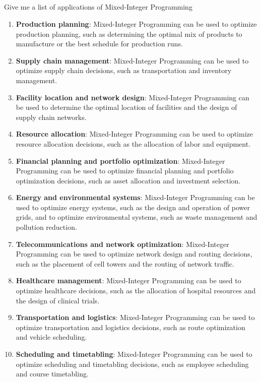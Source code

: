 \newpage

\subsection*{}

\begin{bclogo}[logo=\bcvaletcoeur]{\small \vspace{.2cm} Give me a list of applications of Mixed-Integer Programming}
\vspace{.2cm}

\footnotesize

\begin{enumerate}
\item \textbf{Production planning}: Mixed-Integer Programming can be used to optimize production planning, such as determining the optimal mix of products to manufacture or the best schedule for production runs.
\item \textbf{Supply chain management}: Mixed-Integer Programming can be used to optimize supply chain decisions, such as transportation and inventory management.
\item \textbf{Facility location and network design}: Mixed-Integer Programming can be used to determine the optimal location of facilities and the design of supply chain networks.
\item \textbf{Resource allocation}: Mixed-Integer Programming can be used to optimize resource allocation decisions, such as the allocation of labor and equipment.
\item \textbf{Financial planning and portfolio optimization}: Mixed-Integer Programming can be used to optimize financial planning and portfolio optimization decisions, such as asset allocation and investment selection.
\item \textbf{Energy and environmental systems}: Mixed-Integer Programming can be used to optimize energy systems, such as the design and operation of power grids, and to optimize environmental systems, such as waste management and pollution reduction.
\item \textbf{Telecommunications and network optimization}: Mixed-Integer Programming can be used to optimize network design and routing decisions, such as the placement of cell towers and the routing of network traffic.
\item \textbf{Healthcare management}: Mixed-Integer Programming can be used to optimize healthcare decisions, such as the allocation of hospital resources and the design of clinical trials.
\item \textbf{Transportation and logistics}: Mixed-Integer Programming can be used to optimize transportation and logistics decisions, such as route optimization and vehicle scheduling.
\item \textbf{Scheduling and timetabling}: Mixed-Integer Programming can be used to optimize scheduling and timetabling decisions, such as employee scheduling and course timetabling.
\end{enumerate}

\vspace{.2cm}
\end{bclogo}
\vspace{1cm}




